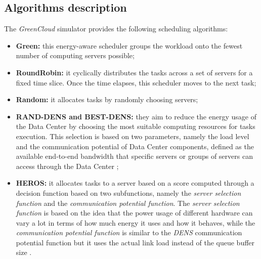 \subsection{Algorithms description}
The \emph{GreenCloud} simulator provides the following scheduling algorithms:
\begin{itemize}
    \item \textbf{Green:} this energy-aware scheduler groups the workload onto the fewest number of computing servers possible;
    \item \textbf{RoundRobin:} it cyclically distributes the tasks across a set of servers for a fixed time slice. Once the time elapses, this scheduler moves to the next task;
    \item \textbf{Random:} it allocates tasks by randomly choosing servers;
    \item \textbf{RAND-DENS and BEST-DENS:} they aim to reduce the energy usage of the Data Center by choosing the most suitable computing resources for tasks execution. This selection is based on two parameters, namely the load level and the communication potential of Data Center components, defined as the available end-to-end bandwidth that specific servers or groups of servers can access through the Data Center \cite{kliazovich2013dens};
    \item \textbf{HEROS:} it allocates tasks to a server based on a score computed through a decision function based on two subfunctions, namely the \emph{server selection function} and the \emph{communication potential function}. The \emph{server selection function} is based on the idea that the power usage of different hardware can vary a lot in terms of how much energy it uses and how it behaves, while the \emph{communication potential function} is similar to the \emph{DENS} communication potential function but it uses the actual link load instead of the queue buffer size \cite{guzek2015heros}.
\end{itemize}

